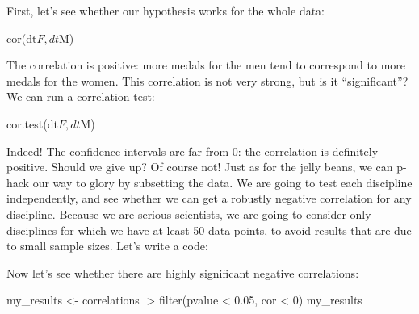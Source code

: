 \documentclass[
  letterpaper,
  DIV=11,
  numbers=noendperiod]{scrreprt}
\newenvironment{Shaded}{\begin{snugshade}}{\end{snugshade}}
\newcommand{\NormalTok}[1]{\textcolor[rgb]{0.00,0.23,0.31}{#1}}
\begin{document}
First, let's see whether our hypothesis works for the whole data:

\begin{Shaded}
\begin{Highlighting}[]
\NormalTok{cor(dt$F, dt$M)}
\end{Highlighting}
\end{Shaded}

The correlation is positive: more medals for the men tend to correspond
to more medals for the women. This correlation is not very strong, but
is it ``significant''? We can run a correlation test:

\begin{Shaded}
\begin{Highlighting}[]
\NormalTok{cor.test(dt$F, dt$M)}
\end{Highlighting}
\end{Shaded}

Indeed! The confidence intervals are far from 0: the correlation is
definitely positive. Should we give up? Of course not! Just as for the
jelly beans, we can p-hack our way to glory by subsetting the data. We
are going to test each discipline independently, and see whether we can
get a robustly negative correlation for any discipline. Because we are
serious scientists, we are going to consider only disciplines for which
we have at least 50 data points, to avoid results that are due to small
sample sizes. Let's write a code:

\begin{Shaded}
\end{Shaded}

Now let's see whether there are highly significant negative
correlations:

\begin{Shaded}
\begin{Highlighting}[]
\NormalTok{my\_results \textless{}{-} correlations |\textgreater{} filter(pvalue \textless{} 0.05, cor \textless{} 0)}
\NormalTok{my\_results}
\end{Highlighting}
\end{Shaded}
\end{document}
